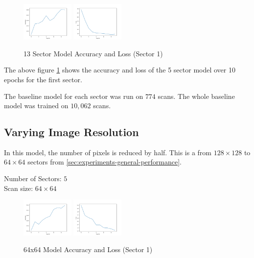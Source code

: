 \documentclass[10pt,twocolumn,letterpaper]{article}
\begin{document}
         \begin{figure}[h]
            \centering
            \includegraphics[width=0.23\textwidth]{./images/training_accuracy_13_sector_128_px.png}
            \includegraphics[width=0.23\textwidth]{./images/training_loss_13_sector_128_px.png}
            \caption{13 Sector Model Accuracy and Loss (Sector 1)}
            \label{fig:experiments-13-sector-acc-loss}
         \end{figure}
    
         The above figure \ref{fig:experiments-13-sector-acc-loss} shows the accuracy and loss of the 5 sector model over 10 epochs for the first sector.
    
         The baseline model for each sector was run on $774$ scans. The whole baseline model was trained on $10,062$ scans.
   \subsection{Varying Image Resolution} \label{sec:experiements-res}
      In this model, the number of pixels is reduced by half. This is a from $128 \times 128$ to $64 \times 64$ sectors from \ref{sec:experiments-general-performance}.
      \begin{center}
         Number of Sectors: $5$ \\
         Scan size: $64 \times 64$
      \end{center}

      \begin{figure}[h]
         \centering
         \includegraphics[width=0.23\textwidth]{./images/training_accuracy_5_sector_64_px.png}
         \includegraphics[width=0.23\textwidth]{./images/training_loss_5_sector_64_px.png}
         \caption{64x64 Model Accuracy and Loss (Sector 1)}
         \label{fig:experiments-64-px-acc-loss}
      \end{figure}
    
\end{document}
